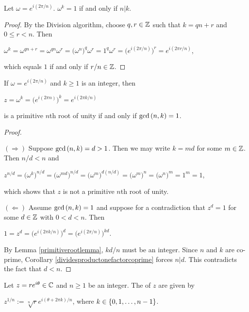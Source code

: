 \documentclass[11pt,fleqn,dvipsnames,usenames]{article}
\begin{document}
\begin{lemma}\label{primitiverootlemma}
Let $\omega = e^{i(2\pi/n)}$.  $\omega^{k} = 1$ if and only if $n|k$.
\end{lemma}
%
\begin{proof}
By the Division algorithm, choose $q,r\in\mathbb{Z}$ such that $k = qn + r$ and $0\leq r < n$.  Then
\begin{center}
$\omega^{k} = \omega^{qn + r} = \omega^{qn}\omega^{r} = \big(\omega^{n})^{q}\omega^{r} = 1^{q}\omega^{r} = \big(e^{i(2\pi/n)}\big)^{r} = e^{i(2\pi r/n)}$,
\end{center}
which equals $1$ if and only if $r/n\in\mathbb{Z}$.
\end{proof}
%
\begin{theorem}
If $\omega = e^{i(2\pi/n)}$ and $k\geq 1$ is an integer, then
\begin{center}
$z = \omega^{k} = \big(e^{i(2\pi n)}\big)^{k} = e^{i(2\pi k/n)}$
\end{center}
is a primitive $n$th root of unity if and only if $\text{gcd}\left(n,k\right) = 1$.
\end{theorem}
%
\begin{proof}~

$(\Rightarrow)$ Suppose $\text{gcd}\left(n,k\right) = d > 1$.  Then we may write $k = md$ for some $m\in\mathbb{Z}$.  Then $n/d < n$ and
\begin{center}
$z^{n/d} = \big(\omega^{k}\big)^{n/d} = \big(\omega^{md}\big)^{n/d} =  \big(\omega^{m}\big)^{d(n/d)} = \big(\omega^{m}\big)^{n} = \big(\omega^{n}\big)^{m} = 1^{m} = 1$,
\end{center}
which shows that $z$ is not a primitive $n$th root of unity.
\vsp

$(\Leftarrow)$ Assume $\text{gcd}\left(n,k\right) = 1$ and suppose for a contradiction that $z^{d} = 1$ for some $d\in\mathbb{Z}$ with $0 < d < n$.  Then
\begin{center}
$1 = z^{d} = \big(e^{i(2\pi k/n)}\big)^{d} = \big(e^{i(2\pi/n)}\big)^{kd}$.
\end{center}
By Lemma \ref{primitiverootlemma}, $kd/n$ must be an integer.  Since $n$ and $k$ are co-prime, Corollary \ref{dividesproductonefactorcoprime} forces $n|d$.  This contradicts the fact that $d<n$.
\end{proof}
%
\begin{definition}
Let $z = re^{i\theta}\in \mathbb{C}$ and $n\geq 1$ be an integer. The  of $z$ are given by
\begin{center}
$z^{1/n} := \sqrt[n]{r}e^{i(\theta + 2\pi k)/n}$, where $k\in\left\{0, 1, \ldots, n -1\right\}$.
\end{center}
\end{definition}
%
\end{document}
